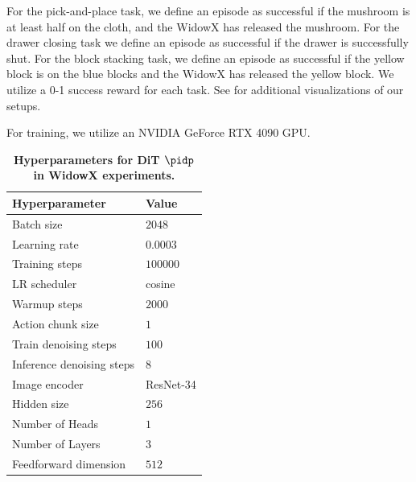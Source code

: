 For the pick-and-place task, we define an episode as successful if the mushroom is at least half on the cloth, and the WidowX has released the mushroom. For the drawer closing task we define an episode as successful if the drawer is successfully shut. For the block stacking task, we define an episode as successful if the yellow block is on the blue blocks and the WidowX has released the yellow block. We utilize a 0-1 success reward for each task. See  for additional visualizations of our setups.

For \algname training, we utilize an NVIDIA GeForce RTX 4090 GPU.


\begin{table}
\caption{
\footnotesize
\textbf{Hyperparameters for DiT $\pidp$ in WidowX experiments.}
}
\label{tab:dit_params}
\vspace{5pt}
\begin{center}
\scalebox{0.9}
{
\begin{tabular}{ll}
    \toprule
    \textbf{Hyperparameter} & Value \\
    \midrule
Batch size &  $2048$ \\
Learning rate & $0.0003$ \\
Training steps & $100000$ \\
LR scheduler & cosine \\
Warmup steps & $2000$ \\
\hline
Action chunk size & $1$ \\
Train denoising steps & $100$ \\
Inference denoising steps & $8$ \\
Image encoder & ResNet-34 \\
Hidden size & $256$ \\
Number of Heads & $1$ \\
Number of Layers & $3$ \\
Feedforward dimension & $512$ \\
    \bottomrule
\end{tabular}
}
\end{center}
\end{table}






